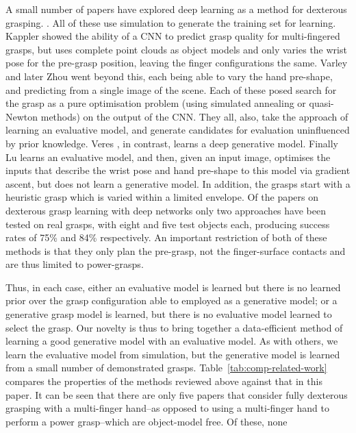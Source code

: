 A small number of papers have explored deep learning as a method for dexterous grasping. \cite{lu2017planning,varley2015generating,veres2017modeling,zhou20176dof,kappler2015leveraging}. All of these use simulation to generate the training set for learning. Kappler \cite{kappler2015leveraging} showed the ability of a CNN to predict grasp quality for multi-fingered grasps, but uses complete point clouds as object models and only varies the wrist pose for the pre-grasp position, leaving the finger configurations the same. Varley \cite{varley2015generating} and later Zhou \cite{zhou20176dof} went beyond this, each being able to vary the hand pre-shape, and predicting from a single image of the scene. Each of these posed search for the grasp as a pure optimisation problem (using simulated annealing or quasi-Newton methods) on the output of the CNN. They all, also, take the approach of learning an evaluative model, and generate candidates for evaluation uninfluenced by prior knowledge. Veres \cite{veres2017modeling}, in contrast, learns a deep generative model. Finally Lu \cite{lu2017planning} learns an evaluative model, and then, given an input image, optimises the inputs that describe the wrist pose and hand pre-shape to this model via gradient ascent, but does not learn a generative model. In addition, the grasps start with a heuristic grasp which is varied within a limited envelope. Of the papers on dexterous grasp learning with deep networks only two approaches \cite{varley2015generating,lu2017planning} have been tested on real grasps, with eight and five test objects each, producing success rates of 75\% and 84\% respectively. An important restriction of both of these methods is that they only plan the pre-grasp, not the finger-surface contacts and are thus limited to power-grasps.

Thus, in each case, either an evaluative model is learned but there is no learned prior over the grasp configuration able to employed as a generative model; or a generative grasp model is learned, but there is no evaluative model learned to select the grasp. Our novelty is thus to bring together a data-efficient method of learning a good generative model with an evaluative model. As with others, we learn the evaluative model from simulation, but the generative model is learned from a small number of demonstrated grasps. Table~\ref{tab:comp-related-work} compares the properties of the methods reviewed above against that in this paper. It can be seen that there are only five papers that consider fully dexterous grasping with a multi-finger hand--as opposed to using a multi-finger hand to perform a power grasp--which are object-model free. Of these, none 

